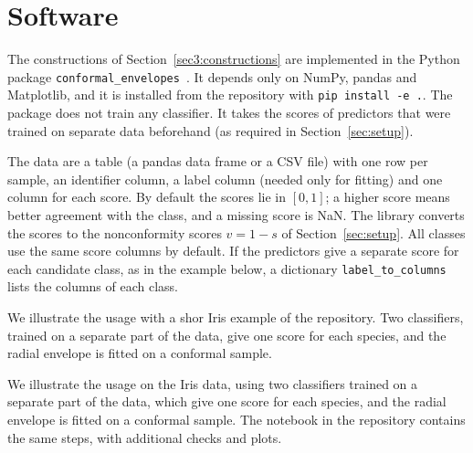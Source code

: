 \section{Software}\label{sec:software}

The constructions of Section~\ref{sec3:constructions} are implemented in the Python package 
\texttt{conformal\_envelopes}~\cite{conformalenvelopes}. It depends only on NumPy, pandas and Matplotlib, and it is 
installed from the repository with \texttt{pip install -e .}. The package does not train any classifier. It takes the 
scores of predictors that were trained on separate data beforehand (as required in Section~\ref{sec:setup}).

The data are a table (a pandas data frame or a CSV file) with one row per sample, an identifier column, 
a label column (needed only for fitting) and one column for each score. By default the scores lie in $[0,1]$; a higher 
score means better agreement with the class, and a missing score is NaN. The library converts the scores to the 
nonconformity scores $v=1-s$ of Section~\ref{sec:setup}. All classes use the same score columns by default. If the 
predictors give a separate score for each candidate class, as in the example below, a dictionary \texttt{label\_to\_columns} 
lists the columns of each class.

We illustrate the usage with a shor Iris example of the repository. Two classifiers, trained on a separate part of the data, give one score for each species, and the radial envelope is fitted on a conformal sample.

We illustrate the usage on the Iris data, using two classifiers trained on a separate part of the data, which give one 
score for each species, and the radial envelope is fitted on a conformal sample. The notebook in the repository contains 
the same steps, with additional checks and plots.


